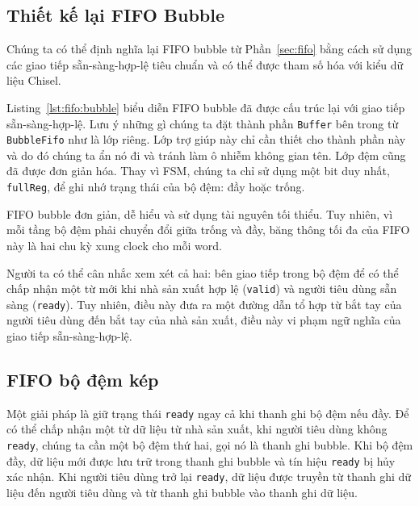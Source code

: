 \documentclass[%
    10pt,
    headinclude, footexclude,
    openright, %
    notitlepage,
    cleardoubleempty,
    headsepline,
    pointlessnumbers,
    bibtotoc, idxtotoc,
    ]{scrbook}
\newcommand{\code}[1]{{\small{\texttt{#1}}}}
\begin{document}
\subsection{Thiết kế lại FIFO Bubble}

Chúng ta có thể định nghĩa lại FIFO bubble từ Phần~\ref{sec:fifo} bằng cách sử dụng các giao tiếp sẵn-sàng-hợp-lệ tiêu chuẩn và có thể được tham số hóa với kiểu dữ liệu Chisel. 


Listing~\ref{lst:fifo:bubble} biểu diễn FIFO bubble đã được cấu trúc lại với giao tiếp sẵn-sàng-hợp-lệ. Lưu ý những gì chúng ta đặt thành phần \code{Buffer} bên trong từ \code{BubbleFifo} như là lớp riêng. Lớp trợ giúp này chỉ cần thiết cho thành phần này và do đó chúng ta ẩn nó đi và tránh làm ô nhiễm không gian tên. Lớp đệm cũng đã được đơn giản hóa. Thay vì FSM, chúng ta chỉ sử dụng một bit duy nhất, \code{fullReg}, để ghi nhớ trạng thái của bộ đệm: đầy hoặc trống.

FIFO bubble đơn giản, dễ hiểu và sử dụng tài nguyên tối thiểu. Tuy nhiên, vì mỗi tầng bộ đệm phải chuyển đổi giữa trống và đầy, băng thông tối đa của FIFO này là hai chu kỳ xung clock cho mỗi word.

Người ta có thể cân nhắc xem xét cả hai: bên giao tiếp trong bộ đệm để có thể chấp nhận một từ mới khi nhà sản xuất hợp lệ (\code{valid}) và người tiêu dùng sẵn sàng (\code{ready}). Tuy nhiên, điều này đưa ra một đường dẫn tổ hợp từ bắt tay của người tiêu dùng đến bắt tay của nhà sản xuất, điều này vi phạm ngữ nghĩa của giao tiếp sẵn-sàng-hợp-lệ. 

\subsection{FIFO bộ đệm kép}


Một giải pháp là giữ trạng thái \code{ready} ngay cả khi thanh ghi bộ đệm nếu đầy. Để có thể chấp nhận một từ dữ liệu từ nhà sản xuất, khi người tiêu dùng không \code{ready}, chúng ta cần một bộ đệm thứ hai, gọi nó là thanh ghi bubble. Khi bộ đệm đầy, dữ liệu mới được lưu trữ trong thanh ghi bubble và tín hiệu \code{ready} bị hủy xác nhận. Khi người tiêu dùng trở lại \code{ready}, dữ liệu được truyền từ thanh ghi dữ liệu đến người tiêu dùng và từ thanh ghi bubble vào thanh ghi dữ liệu. 

\end{document}
